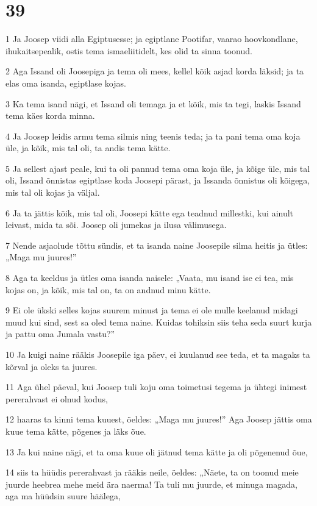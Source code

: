 \chapter{39}

\par 1 Ja Joosep viidi alla Egiptusesse; ja egiptlane Pootifar, vaarao hoovkondlane, ihukaitsepealik, ostis tema ismaeliitidelt, kes olid ta sinna toonud.
\par 2 Aga Issand oli Joosepiga ja tema oli mees, kellel kõik asjad korda läksid; ja ta elas oma isanda, egiptlase kojas.
\par 3 Ka tema isand nägi, et Issand oli temaga ja et kõik, mis ta tegi, laskis Issand tema käes korda minna.
\par 4 Ja Joosep leidis armu tema silmis ning teenis teda; ja ta pani tema oma koja üle, ja kõik, mis tal oli, ta andis tema kätte.
\par 5 Ja sellest ajast peale, kui ta oli pannud tema oma koja üle, ja kõige üle, mis tal oli, Issand õnnistas egiptlase koda Joosepi pärast, ja Issanda õnnistus oli kõigega, mis tal oli kojas ja väljal.
\par 6 Ja ta jättis kõik, mis tal oli, Joosepi kätte ega teadnud millestki, kui ainult leivast, mida ta sõi. Joosep oli jumekas ja ilusa välimusega.
\par 7 Nende asjaolude tõttu sündis, et ta isanda naine Joosepile silma heitis ja ütles: „Maga mu juures!”
\par 8 Aga ta keeldus ja ütles oma isanda naisele: „Vaata, mu isand ise ei tea, mis kojas on, ja kõik, mis tal on, ta on andnud minu kätte.
\par 9 Ei ole ükski selles kojas suurem minust ja tema ei ole mulle keelanud midagi muud kui sind, sest sa oled tema naine. Kuidas tohiksin siis teha seda suurt kurja ja pattu oma Jumala vastu?”
\par 10 Ja kuigi naine rääkis Joosepile iga päev, ei kuulanud see teda, et ta magaks ta kõrval ja oleks ta juures.
\par 11 Aga ühel päeval, kui Joosep tuli koju oma toimetusi tegema ja ühtegi inimest pererahvast ei olnud kodus,
\par 12 haaras ta kinni tema kuuest, öeldes: „Maga mu juures!” Aga Joosep jättis oma kuue tema kätte, põgenes ja läks õue.
\par 13 Ja kui naine nägi, et ta oma kuue oli jätnud tema kätte ja oli põgenenud õue,
\par 14 siis ta hüüdis pererahvast ja rääkis neile, öeldes: „Näete, ta on toonud meie juurde heebrea mehe meid ära naerma! Ta tuli mu juurde, et minuga magada, aga ma hüüdsin suure häälega,
